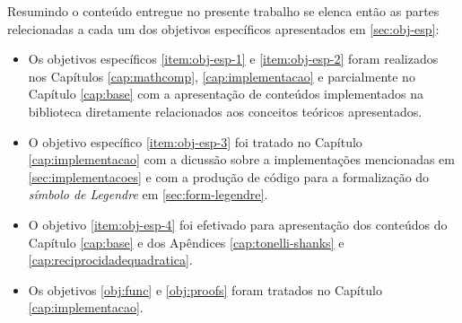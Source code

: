 Resumindo o conteúdo entregue no presente trabalho se elenca então as partes relecionadas a cada um dos objetivos específicos apresentados em \ref{sec:obj-esp}: 
\begin{itemize}
    \item Os objetivos específicos \ref{item:obj-esp-1} e \ref{item:obj-esp-2} foram realizados nos Capítulos \ref{cap:mathcomp}, \ref{cap:implementacao} e parcialmente no Capítulo \ref{cap:base} com a apresentação de conteúdos implementados na biblioteca diretamente relacionados aos conceitos teóricos apresentados.  
    
    \item O objetivo específico \ref{item:obj-esp-3} foi tratado no Capítulo \ref{cap:implementacao} com a dicussão sobre a implementações mencionadas em \ref{sec:implementacoes} e com a produção de código para a formalização do \textit{símbolo de Legendre} em \ref{sec:form-legendre}.
    
    \item O objetivo \ref{item:obj-esp-4} foi efetivado para apresentação dos conteúdos do Capítulo \ref{cap:base} e dos Apêndices \ref{cap:tonelli-shanks} e \ref{cap:reciprocidadequadratica}.
    
    \item Os objetivos \ref{obj:func} e \ref{obj:proofs} foram tratados no Capítulo \ref{cap:implementacao}.
\end{itemize}


